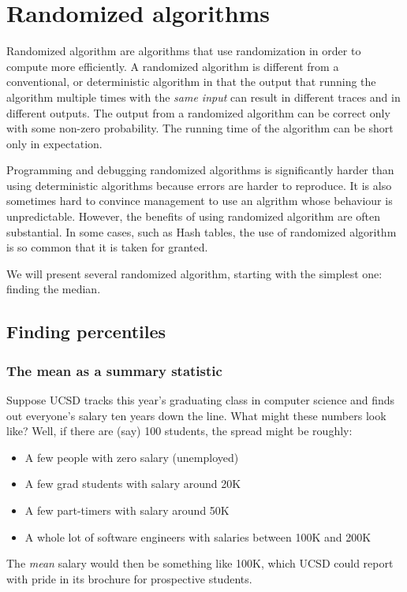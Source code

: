 \chapter{Randomized algorithms}

Randomized algorithm are algorithms that use randomization in order to
compute more efficiently. A randomized algorithm is different from a
conventional, or deterministic algorithm in that the output that
running the algorithm multiple times with the {\em same input} can
result in different traces and in different outputs. The output from a
randomized algorithm can be correct only with some non-zero
probability. The running time of the algorithm can be short only in
expectation.

Programming and debugging randomized algorithms is significantly
harder than using deterministic algorithms because errors are harder
to reproduce. It is also sometimes hard to convince management to use
an algrithm whose behaviour is unpredictable. However, the benefits of
using randomized algorithm are often substantial. In some cases, such
as Hash tables, the use of randomized algorithm is so common that it
is taken for granted.

We will present several randomized algorithm, starting with the
simplest one: finding the median.

\section{Finding percentiles}

\subsection{The mean as a summary statistic}

Suppose UCSD tracks this year's graduating class in computer science and finds out everyone's 
salary ten years down the line. What might these numbers look like? Well, if there are (say)
100 students, the spread might be roughly:
\begin{itemize}
\item A few people with zero salary (unemployed)
\item A few grad students with salary around 20K
\item A few part-timers with salary around 50K
\item A whole lot of software engineers with salaries between 100K and 200K
\end{itemize}
The {\it mean} salary would then be something like 100K, which UCSD could report with
pride in its brochure for prospective students.


